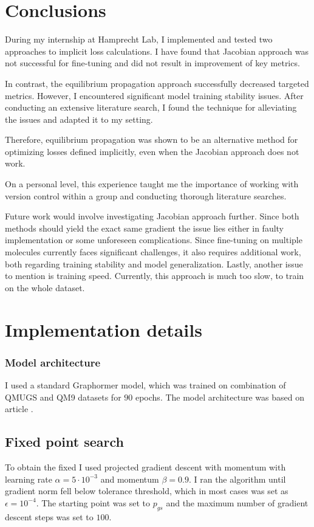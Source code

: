 \documentclass[a4paper,10.5pt]{report}
\begin{document}
\clearpage
\section{Conclusions}
During my internship at Hamprecht Lab, I implemented and tested two approaches to implicit loss calculations. I have found that Jacobian approach was not successful for fine-tuning and did not result in improvement of key metrics.

In contrast, the equilibrium propagation approach successfully decreased targeted metrics. However, I encountered significant model training stability issues. After conducting an extensive literature search, I found the technique for alleviating the issues and adapted it to my setting.

Therefore, equilibrium propagation was shown to be an alternative method for optimizing losses defined implicitly, even when the Jacobian approach does not work.

On a personal level, this experience taught me the importance of working with version control within a group and conducting thorough literature searches.

Future work would involve investigating Jacobian approach further. Since both methods should yield the exact same gradient the issue lies either in faulty implementation or some unforeseen complications.
Since fine-tuning on multiple molecules currently faces significant challenges, it also requires additional work, both regarding training stability and model generalization. 
Lastly, another issue to mention is training speed. Currently, this approach is much too slow, to train on the whole dataset.

\nocite{*}





\appendix
\section{Implementation details} \label{sec:impl}

\subsubsection{Model architecture}
I used a standard Graphormer model, which was trained on combination of QMUGS and QM9 datasets for $90$ epochs. The model architecture was based on article \cite{zhang2024overcoming}.

\subsection{Fixed point search}
To obtain the fixed I used projected gradient descent with momentum with learning rate $\alpha = 5\cdot 10^{-3}$ and momentum $\beta = 0.9$. I ran the algorithm until gradient norm fell below tolerance threshold, which in most cases was set as $\epsilon = 10^{-4}$. The starting point was set to $p_{gs}$ and the maximum number of gradient descent steps was set to $100$.
\end{document}
